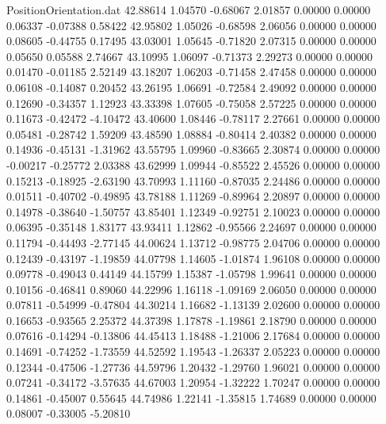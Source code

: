 \begin{filecontents}{PositionOrientation.dat}
  42.88614    1.04570   -0.68067     2.01857    0.00000    0.00000    0.06337   -0.07388    0.58422
  42.95802    1.05026   -0.68598     2.06056    0.00000    0.00000    0.08605   -0.44755    0.17495
  43.03001    1.05645   -0.71820     2.07315    0.00000    0.00000    0.05650    0.05588    2.74667
  43.10995    1.06097   -0.71373     2.29273    0.00000    0.00000    0.01470   -0.01185    2.52149
  43.18207    1.06203   -0.71458     2.47458    0.00000    0.00000    0.06108   -0.14087    0.20452
  43.26195    1.06691   -0.72584     2.49092    0.00000    0.00000    0.12690   -0.34357    1.12923
  43.33398    1.07605   -0.75058     2.57225    0.00000    0.00000    0.11673   -0.42472   -4.10472
  43.40600    1.08446   -0.78117     2.27661    0.00000    0.00000    0.05481   -0.28742    1.59209
  43.48590    1.08884   -0.80414     2.40382    0.00000    0.00000    0.14936   -0.45131   -1.31962
  43.55795    1.09960   -0.83665     2.30874    0.00000    0.00000   -0.00217   -0.25772    2.03388
  43.62999    1.09944   -0.85522     2.45526    0.00000    0.00000    0.15213   -0.18925   -2.63190
  43.70993    1.11160   -0.87035     2.24486    0.00000    0.00000    0.01511   -0.40702   -0.49895
  43.78188    1.11269   -0.89964     2.20897    0.00000    0.00000    0.14978   -0.38640   -1.50757
  43.85401    1.12349   -0.92751     2.10023    0.00000    0.00000    0.06395   -0.35148    1.83177
  43.93411    1.12862   -0.95566     2.24697    0.00000    0.00000    0.11794   -0.44493   -2.77145
  44.00624    1.13712   -0.98775     2.04706    0.00000    0.00000    0.12439   -0.43197   -1.19859
  44.07798    1.14605   -1.01874     1.96108    0.00000    0.00000    0.09778   -0.49043    0.44149
  44.15799    1.15387   -1.05798     1.99641    0.00000    0.00000    0.10156   -0.46841    0.89060
  44.22996    1.16118   -1.09169     2.06050    0.00000    0.00000    0.07811   -0.54999   -0.47804
  44.30214    1.16682   -1.13139     2.02600    0.00000    0.00000    0.16653   -0.93565    2.25372
  44.37398    1.17878   -1.19861     2.18790    0.00000    0.00000    0.07616   -0.14294   -0.13806
  44.45413    1.18488   -1.21006     2.17684    0.00000    0.00000    0.14691   -0.74252   -1.73559
  44.52592    1.19543   -1.26337     2.05223    0.00000    0.00000    0.12344   -0.47506   -1.27736
  44.59796    1.20432   -1.29760     1.96021    0.00000    0.00000    0.07241   -0.34172   -3.57635
  44.67003    1.20954   -1.32222     1.70247    0.00000    0.00000    0.14861   -0.45007    0.55645
  44.74986    1.22141   -1.35815     1.74689    0.00000    0.00000    0.08007   -0.33005   -5.20810

\end{filecontents}
